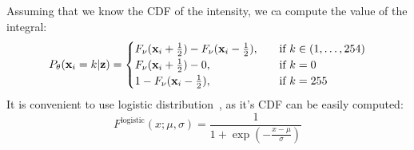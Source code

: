 Assuming that we know the CDF of the intensity, we ca compute the value of the integral:
\begin{equation}
    P_{\theta}({\mathbf{x}}_i = k|{\mathbf{z}}) =\begin{cases}
    F_{\nu}({\mathbf{x}}_i + \frac{1}{2}) - F_{\nu}({\mathbf{x}}_i - \frac{1}{2}),\quad &\text{if } k \in (1, \dots, 254) \\
    F_{\nu}({\mathbf{x}}_i + \frac{1}{2}) - 0,\quad &\text{if } k = 0 \\
    1 - F_{\nu}({\mathbf{x}}_i - \frac{1}{2}),\quad &\text{if } k = 255 \\
    \end{cases}
\end{equation}
It is convenient to use logistic distribution~\cite{kingma2016improved}, as it's CDF can be easily computed:
\begin{equation}
    F^{\text{logistic}}(x; \mu, \sigma) = \frac{1}{1 + \exp (- \frac{x - \mu}{\sigma})}
\end{equation}
